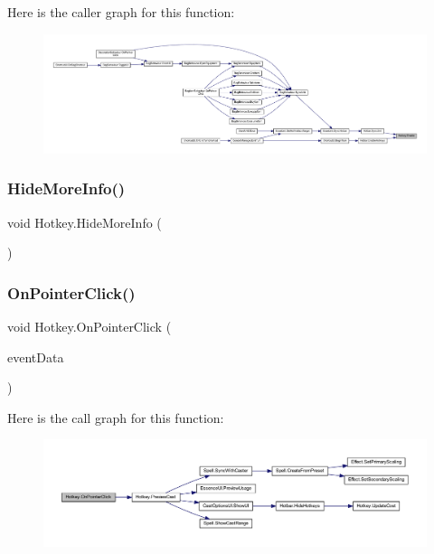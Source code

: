 Here is the caller graph for this function\+:\nopagebreak
\begin{figure}[H]
\begin{center}
\leavevmode
\includegraphics[width=350pt]{class_hotkey_ae078d4716dbd3a3c703a3ef341e56562_icgraph}
\end{center}
\end{figure}
\mbox{\label{class_hotkey_a9362ee088eb695642f30c3b8818d0b1a}} 
\subsubsection{\texorpdfstring{HideMoreInfo()}{HideMoreInfo()}}
{\footnotesize\ttfamily void Hotkey.\+Hide\+More\+Info (\begin{DoxyParamCaption}{ }\end{DoxyParamCaption})}

\mbox{\label{class_hotkey_a86ced9a614ad8d537fcab4738abcb0ef}} 
\subsubsection{\texorpdfstring{OnPointerClick()}{OnPointerClick()}}
{\footnotesize\ttfamily void Hotkey.\+On\+Pointer\+Click (\begin{DoxyParamCaption}\item[{Pointer\+Event\+Data}]{event\+Data }\end{DoxyParamCaption})}

Here is the call graph for this function\+:\nopagebreak
\begin{figure}[H]
\begin{center}
\leavevmode
\includegraphics[width=350pt]{class_hotkey_a86ced9a614ad8d537fcab4738abcb0ef_cgraph}
\end{center}
\end{figure}
\mbox{\label{class_hotkey_a209f6726592cf69b7e21bd68ced48cb3}} 
